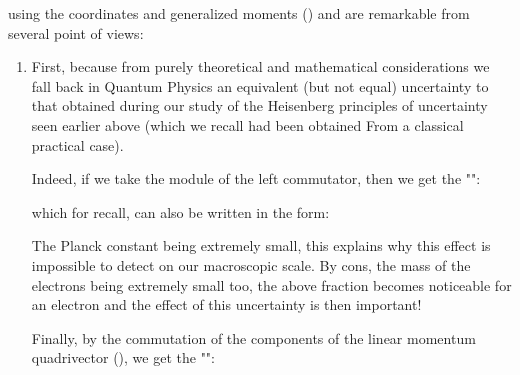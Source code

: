 	using the coordinates and generalized moments () and are remarkable from several point of views:
	\begin{enumerate}
		\item First, because from purely theoretical and mathematical considerations we fall back in Quantum Physics an equivalent (but not equal) uncertainty to that obtained during our study of the Heisenberg principles of uncertainty seen earlier above (which we recall had been obtained From a classical practical case).

		Indeed, if we take the module of the left commutator, then we get the "":
		
		which for recall, can also be written in the form:
		
		The Planck constant being extremely small, this explains why this effect is impossible to detect on our macroscopic scale. By cons, the mass of the electrons being extremely small too, the above fraction becomes noticeable for an electron and the effect of this uncertainty is then important!
		
		Finally, by the commutation of the components of the linear momentum quadrivector (), we get the "":
		

\end{enumerate}
